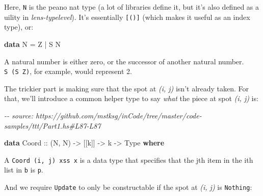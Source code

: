 \documentclass[]{article}
\newenvironment{Shaded}{}{}
\newcommand{\CommentTok}[1]{\textcolor[rgb]{0.38,0.63,0.69}{\textit{#1}}}
\newcommand{\DataTypeTok}[1]{\textcolor[rgb]{0.56,0.13,0.00}{#1}}
\newcommand{\KeywordTok}[1]{\textcolor[rgb]{0.00,0.44,0.13}{\textbf{#1}}}
\newcommand{\NormalTok}[1]{#1}
\newcommand{\OperatorTok}[1]{\textcolor[rgb]{0.40,0.40,0.40}{#1}}
\newcommand{\OtherTok}[1]{\textcolor[rgb]{0.00,0.44,0.13}{#1}}
\begin{document}
Here, \texttt{N} is the peano nat type (a lot of libraries define it, but it's
also defined as a uility in \emph{lens-typelevel}). It's essentially
\texttt{{[}(){]}} (which makes it useful as an index type), or:

\begin{Shaded}
\begin{Highlighting}[]
\KeywordTok{data} \DataTypeTok{N} \OtherTok{=} \DataTypeTok{Z} \OperatorTok{|} \DataTypeTok{S} \DataTypeTok{N}
\end{Highlighting}
\end{Shaded}

A natural number is either zero, or the successor of another natural number.
\texttt{S\ (S\ Z)}, for example, would represent 2.

The trickier part is making sure that the spot at \emph{(i, j)} isn't already
taken. For that, we'll introduce a common helper type to say \emph{what} the
piece at spot \emph{(i, j)} is:

\begin{Shaded}
\begin{Highlighting}[]
\CommentTok{{-}{-} source: https://github.com/mstksg/inCode/tree/master/code{-}samples/ttt/Part1.hs\#L87{-}L87}

\KeywordTok{data} \DataTypeTok{Coord}\OtherTok{ ::}\NormalTok{ (}\DataTypeTok{N}\NormalTok{, }\DataTypeTok{N}\NormalTok{) }\OtherTok{{-}\textgreater{}}\NormalTok{ [[k]] }\OtherTok{{-}\textgreater{}}\NormalTok{ k }\OtherTok{{-}\textgreater{}} \DataTypeTok{Type} \KeywordTok{where}
\end{Highlighting}
\end{Shaded}

A \texttt{Coord\ \textquotesingle{}(i,\ j)\ xss\ x} is a data type that
specifies that the jth item in the ith list in \texttt{b} is \texttt{p}.

And we require \texttt{Update} to only be constructable if the spot at \emph{(i,
j)} is \texttt{Nothing}:
\end{document}
